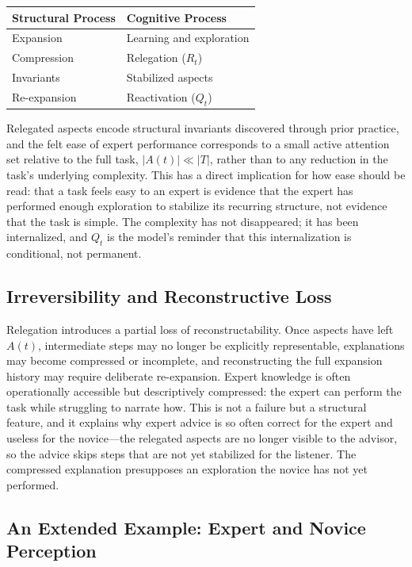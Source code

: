 \documentclass[12pt, a4paper]{article}
\theoremstyle{plain}
\theoremstyle{definition}
\theoremstyle{remark}
\begin{document}
\medskip
\begin{center}
\begin{tabular}{ll}
\toprule
\textbf{Structural Process} & \textbf{Cognitive Process} \\
\midrule
Expansion & Learning and exploration \\
Compression & Relegation ($R_t$) \\
Invariants & Stabilized aspects \\
Re-expansion & Reactivation ($Q_t$) \\
\bottomrule
\end{tabular}
\end{center}
\medskip

Relegated aspects encode structural invariants discovered through prior practice, and the felt ease of expert performance corresponds to a small active attention set relative to the full task, $|A(t)| \ll |T|$, rather than to any reduction in the task's underlying complexity. This has a direct implication for how ease should be read: that a task feels easy to an expert is evidence that the expert has performed enough exploration to stabilize its recurring structure, not evidence that the task is simple. The complexity has not disappeared; it has been internalized, and $Q_t$ is the model's reminder that this internalization is conditional, not permanent.

\subsection{Irreversibility and Reconstructive Loss}

Relegation introduces a partial loss of reconstructability. Once aspects have left $A(t)$, intermediate steps may no longer be explicitly representable, explanations may become compressed or incomplete, and reconstructing the full expansion history may require deliberate re-expansion. Expert knowledge is often operationally accessible but descriptively compressed: the expert can perform the task while struggling to narrate how. This is not a failure but a structural feature, and it explains why expert advice is so often correct for the expert and useless for the novice---the relegated aspects are no longer visible to the advisor, so the advice skips steps that are not yet stabilized for the listener. The compressed explanation presupposes an exploration the novice has not yet performed.

\subsection{An Extended Example: Expert and Novice Perception}
\label{subsec:expert-novice}
\end{document}

